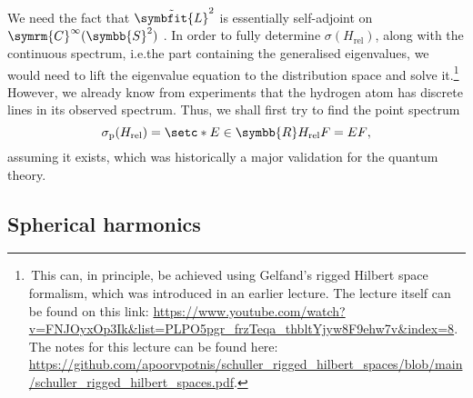 \documentclass[12pt, a4 paper]{article}
\theoremstyle{definition}
\newcommand{\rr}{\symbb{R}}
\newcommand{\spec}{\sigma}
\newcommand{\lvecsquare}{\tilde{\symbfit{L}}^2}
\begin{document}
    We need the fact that $\lvecsquare$ is essentially self-adjoint on $\symrm{C}^\infty(\symbb{S}^2)$ \cite{MorettiDomain}. In order to fully determine $\spec(H_\text{rel})$, along with the continuous spectrum, i.e.\@ the part containing the generalised eigenvalues, we would need to lift the eigenvalue equation to the distribution space and solve it.\footnote{\,This can, in principle, be achieved using Gelfand's rigged Hilbert space formalism, which was introduced in an earlier lecture. The lecture itself can be found on this link: \url{https://www.youtube.com/watch?v=FNJOyxOp3Ik&list=PLPO5pgr_frzTeqa_thbltYjyw8F9ehw7v&index=8}. The notes for this lecture can be found here: \url{https://github.com/apoorvpotnis/schuller_rigged_hilbert_spaces/blob/main/schuller_rigged_hilbert_spaces.pdf}.} However, we already know from experiments that the hydrogen atom has discrete lines in its observed spectrum. Thus, we shall first try to find the point spectrum
    \[
        \spec_{\text{p}}(H_\text{rel}) = \setc*{E \in \rr}{H_\text{rel} F = E F},
    \]
    assuming it exists, which was historically a major validation for the quantum theory.

    \subsection{Spherical harmonics}
\end{document}
